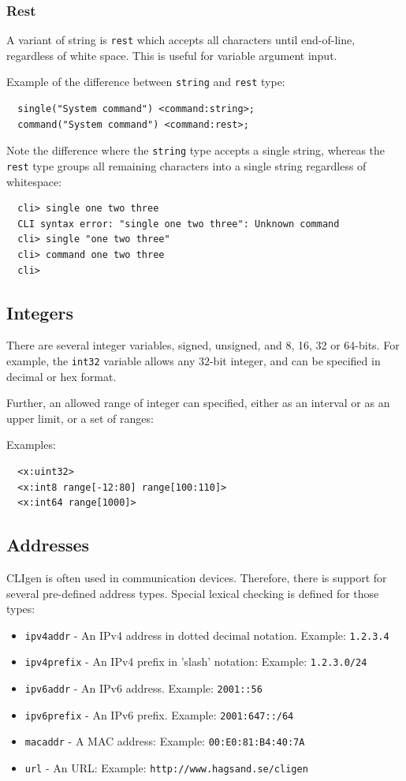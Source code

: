 \documentclass[a4paper, 10pt] {article}
\begin{document}
\subsubsection{Rest}
A variant of string is {\tt rest} which accepts all characters until end-of-line, regardless of white space. This is useful for variable argument input.

Example of the difference between {\tt string} and {\tt rest} type:
\begin{verbatim}
  single("System command") <command:string>;
  command("System command") <command:rest>;
\end{verbatim}

Note the difference where the {\tt string} type accepts a single string, whereas the {\tt rest} type groups all remaining characters into a single string regardless of whitespace:
\begin{verbatim}
  cli> single one two three
  CLI syntax error: "single one two three": Unknown command
  cli> single "one two three"
  cli> command one two three
  cli>
\end{verbatim}

\subsection{Integers}
There are several integer variables, signed, unsigned, and 8, 16, 32 or 64-bits. For example, the {\tt int32} variable allows any 32-bit integer, and can be specified in decimal or hex format. 

Further, an allowed range of integer can specified, either as an interval or as an upper limit, or a set of ranges:

Examples:
\begin{verbatim}
  <x:uint32>
  <x:int8 range[-12:80] range[100:110]>
  <x:int64 range[1000]>
\end{verbatim}

\subsection{Addresses}

CLIgen is often used in communication devices. Therefore, there is
support for several pre-defined address types.  Special lexical
checking is defined for those types:

\begin{itemize}
\item {\tt ipv4addr} - An IPv4 address in dotted decimal notation. Example: {\tt 1.2.3.4}
\item {\tt ipv4prefix} - An IPv4 prefix in 'slash' notation: Example: {\tt 1.2.3.0/24}
\item {\tt ipv6addr} - An IPv6 address. Example: {\tt 2001::56}
\item {\tt ipv6prefix} - An IPv6 prefix. Example: {\tt 2001:647::/64}
\item {\tt macaddr} - A MAC address: Example: {\tt 00:E0:81:B4:40:7A}
\item {\tt url} - An URL: Example: {\tt http://www.hagsand.se/cligen}
\end{itemize}
\end{document}
